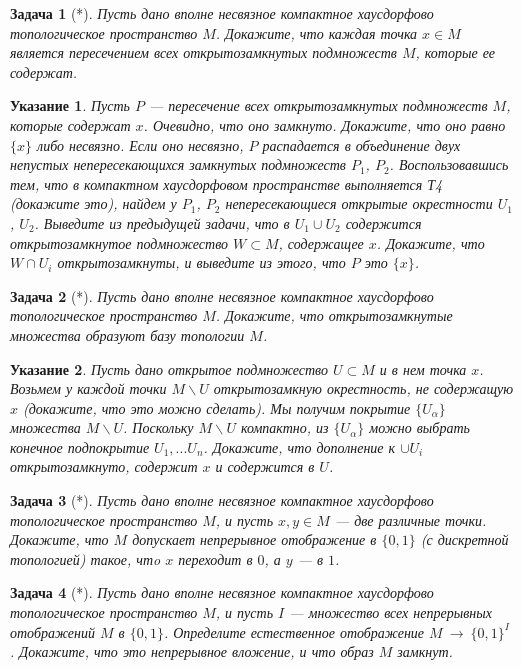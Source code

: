 \documentclass[12pt]{book}
\newcommand{\arrow}{{\:\longrightarrow\:}}
\theoremstyle{upshape}
\newtheorem{zadacha}{Задача}[chapter]
\theoremstyle{generic}
\theoremstyle{upshapenonumber}
\newtheorem{ukazanie}{Указание}[section]
\newcommand{\следствие}{%
     \refstepcounter{teorema}
     {\noindent\bf Следствие \thechapter.\arabic{teorema}:\ }}
\newcommand{\пример}{%
     \refstepcounter{teorema}
     {\noindent\bf Пример \thechapter.\arabic{teorema}:\ }}
\newcommand{\лемма}{%
     \refstepcounter{teorema}
     {\noindent\bf Лемма \thechapter.\arabic{teorema}:\ }}
\newcommand{\теорема}{%
     \refstepcounter{teorema}
     {\noindent\bf Теорема \thechapter.\arabic{teorema}:\ }}
\newcommand{\утверждение}{%
     \refstepcounter{teorema}
     {\noindent\bf Утверждение \thechapter.\arabic{teorema}:\ }}
\begin{document}
{\begin{zadacha}[*] Пусть дано
вполне несвязное компактное хаусдорфово
топологическое пространство $M$.
Докажите, что каждая точка $x\in M$ является пересечением
всех открытозамкнутых подмножеств $M$, которые
ее содержат.
\end{zadacha}

\begin{ukazanie}
Пусть $P$ --- пересечение всех открытозамкнутых подмножеств
$M$, которые содержат $x$. Очевидно, что оно
замкнуто. Докажите, что оно равно $\{x\}$ либо несвязно.
Если оно несвязно, $P$
распадается в объединение двух непустых непересекающихся замкнутых
подмножеств $P_1$, $P_2$. Воспользовавшись тем,
что в компактном хаусдорфовом пространстве выполняется Т4
(докажите это), найдем у $P_1$, $P_2$ непересекающиеся
открытые окрестности $U_1$, $U_2$.
Выведите из предыдущей задачи, что в $U_1 \cup U_2$
содержится открытозамкнутое подмножество $W\subset M$,
содержащее $x$.
Докажите, что $W\cap U_i$ открытозамкнуты, и 
выведите из этого, что $P$ это $\{x\}$.
\end{ukazanie}

\begin{zadacha}[*]
Пусть дано вполне несвязное компактное хаусдорфово
топологическое пространство $M$. Докажите, что
открытозамкнутые множества образуют 
базу топологии $M$.
\end{zadacha}


\begin{ukazanie}
Пусть дано открытое подмножество $U\subset M$ и в нем
точка $x$. Возьмем у каждой точки $M\backslash U$
открытозамкную окрестность, не содержащую $x$
(докажите, что это можно сделать).
Мы получим покрытие $\{U_\alpha\}$ 
множества $M\backslash U$.
Поскольку  $M\backslash U$ компактно, 
из $\{U_\alpha\}$ можно выбрать конечное
подпокрытие $U_1, ... U_n$. Докажите, что
дополнение к $\cup U_i$ открытозамкнуто,
содержит $x$ и содержится в $U$.
\end{ukazanie}

\begin{zadacha}[*]
Пусть дано вполне несвязное компактное хаусдорфово
топологическое пространство $M$, и пусть $x, y \in M$ --- две различные
точки. Докажите, что $M$ допускает непрерывное отображение
в $\{0, 1\}$ (с дискретной топологией) такое, чтo
$x$ переходит в $0$, а $y$ --- в $1$.
\end{zadacha}

\begin{zadacha}[*]
Пусть дано вполне несвязное компактное хаусдорфово
топологическое пространство $M$, и пусть $I$ --- множество
всех непрерывных отображений $M$ в $\{0, 1\}$.
Определите естественное отображение
$M \arrow \{0, 1\}^I$. Докажите, что
это непрерывное вложение, и что образ $M$ замкнут.
\end{zadacha}

}
\end{document}
